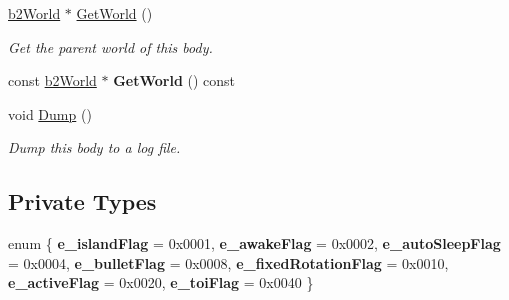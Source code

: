 \begin{DoxyCompactItemize}
\mbox{\label{classb2Body_abfd9466763b20977f9122d0e162dfeb9}} 
\mbox{\hyperlink{classb2World}{b2\+World}} $\ast$ \mbox{\hyperlink{classb2Body_abfd9466763b20977f9122d0e162dfeb9}{Get\+World}} ()
\begin{DoxyCompactList}\small\item\em Get the parent world of this body. \end{DoxyCompactList}\item 
\mbox{\label{classb2Body_a7e0fc2b91fbfc11da467700fd0792088}} 
const \mbox{\hyperlink{classb2World}{b2\+World}} $\ast$ {\bfseries Get\+World} () const
\item 
\mbox{\label{classb2Body_ac9e482f7d9df92801c24e79a7e751d06}} 
void \mbox{\hyperlink{classb2Body_ac9e482f7d9df92801c24e79a7e751d06}{Dump}} ()
\begin{DoxyCompactList}\small\item\em Dump this body to a log file. \end{DoxyCompactList}\end{DoxyCompactItemize}
\subsection*{Private Types}
\begin{DoxyCompactItemize}
\item 
\mbox{\label{classb2Body_af41a158dfe3e0e55bcaaca9ba36f1777}} 
enum \{ \newline
{\bfseries e\+\_\+island\+Flag} = 0x0001, 
{\bfseries e\+\_\+awake\+Flag} = 0x0002, 
{\bfseries e\+\_\+auto\+Sleep\+Flag} = 0x0004, 
{\bfseries e\+\_\+bullet\+Flag} = 0x0008, 
\newline
{\bfseries e\+\_\+fixed\+Rotation\+Flag} = 0x0010, 
{\bfseries e\+\_\+active\+Flag} = 0x0020, 
{\bfseries e\+\_\+toi\+Flag} = 0x0040
 \}
\end{DoxyCompactItemize}
